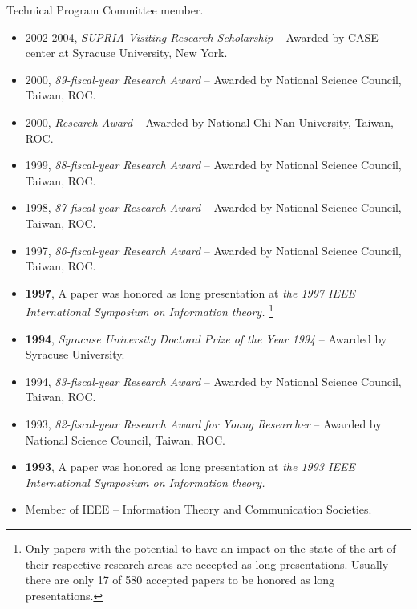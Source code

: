 \begin{llist}
 Technical
Program Committee member.

\bigskip
{}
\begin{itemize}
\item{2002-2004, {\em SUPRIA Visiting Research Scholarship} --
Awarded by CASE center at Syracuse University, New York.}
 \item
{2000,  {\em 89-fiscal-year Research Award} --
 Awarded by National Science Council, Taiwan, ROC.}
\item {2000, {\em Research Award}  --
 Awarded by National Chi Nan University, Taiwan, ROC.}
\item {1999,  {\em 88-fiscal-year Research Award} --
 Awarded by National Science Council, Taiwan, ROC.}
\item {1998, {\em 87-fiscal-year Research Award} --
 Awarded by National Science Council, Taiwan, ROC.}
\item {1997, {\em 86-fiscal-year Research Award} --
 Awarded by National Science Council, Taiwan, ROC.}
\item { {\bf 1997},  A paper was honored as long presentation at {\it
the 1997 IEEE International Symposium on Information theory.}
\footnote{Only
   papers with the potential to have an impact on the state of the art of their respective research areas
    are accepted as long presentations. Usually there are only 17 of 580 accepted papers to be honored
    as long presentations.}}

\item{{\bf 1994}, {\em Syracuse University Doctoral Prize of the Year 1994} --
Awarded by Syracuse University.}
\item {1994, {\em 83-fiscal-year Research Award} --
 Awarded by National Science Council, Taiwan, ROC.}
\item {1993, {\em 82-fiscal-year Research Award for Young
Researcher}
-- Awarded by National Science Council, Taiwan, ROC.}

\item { {\bf 1993}, A paper was honored as long presentation at {\it
the 1993 IEEE International Symposium on Information theory.}}

\end{itemize}

\bigskip

\begin{itemize}
\item{Member of IEEE -- Information Theory and Communication Societies.}
\end{itemize}


\end{llist}

